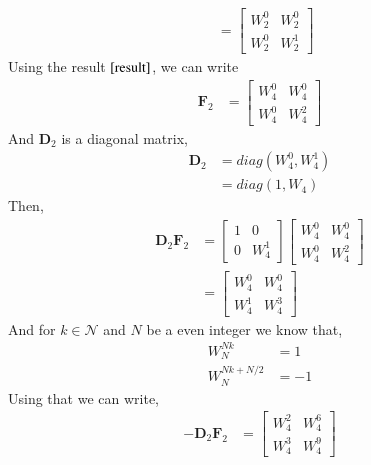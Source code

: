 \documentclass[journal,12pt,twocolumn]{IEEEtran}
\providecommand{\brak}[1]{\ensuremath{\left(#1\right)}}
\let\vec\mathbf
\numberwithin{equation}{section}
\renewcommand\thesection{\arabic{section}}
\begin{document}
\begin{enumerate}[label=\arabic*.,ref=\thesection.\theenumi]
\begin{align}
	  &= \begin{bmatrix}
                  W_2^{0} & W_2^{0} \\
                  W_2^{0} & W_2^{1}
          \end{bmatrix}
  \end{align}
 Using the result $\eqref{result}$, we can write
   \begin{align}
   \vec{F}_{2} &= 
   \begin{bmatrix}
   	W_4^{0} & W_4^{0} \\
   	W_4^{0} & W_4^{2}
   \end{bmatrix} 
\end{align}
 And $\vec{D}_{2}$ is a diagonal matrix,
  \begin{align}
  	\vec{D}_{2} &= diag\brak{W_4^0,W_4^1} \\
  	            &= diag\brak{1,W_4}
  \end{align}
  Then,
   \begin{align}
   	 \vec{D}_2\vec{F}_2 &=\begin{bmatrix}
   	 	                  1 & 0 \\
   	 	                  0 & W_4^{1}
   	                     \end{bmatrix}  
                         \begin{bmatrix}
   	 	                  W_4^{0} & W_4^{0} \\
   	 	                  W_4^{0} & W_4^{2}
   	                      \end{bmatrix} \\
                        &= \begin{bmatrix}
                        	W_4^{0} & W_4^{0} \\
                        	W_4^{1} & W_4^{3}
                          \end{bmatrix}
   \end{align}
And for $k \in \mathcal{N}$ and $N$ be a even integer we know that,
 \begin{align}
 	W_{N}^{Nk} &= 1 \label{result_1}\\
 	W_{N}^{Nk + N/2} &= -1\label{result_2}
 \end{align}
Using that we can write,
  \begin{align}
  	-\vec{D}_2\vec{F}_2 &= \begin{bmatrix}
  		                     W_4^{2} & W_4^{6} \\
  		                     W_4^{3} & W_4^{9}
  	                       \end{bmatrix}

\end{align}
\end{enumerate}
\end{document}
